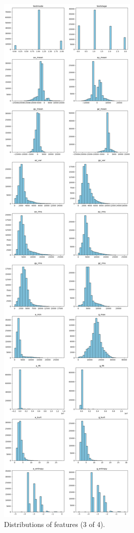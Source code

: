 \documentclass[10pt,twocolumn]{article}
\begin{document}
\begin{figure}[H]
    \centering
    \includegraphics[width=0.85\linewidth, height=0.9\textheight]{images/distribution_1.png}
    \caption{Distributions of features (3 of 4).}
    \label{fig:distribution-1}
\end{figure}
\end{document}
